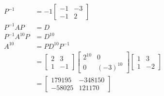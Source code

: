 \documentclass{math}
\begin{document}
\begin{align*}
  P^{-1} &= -1\begin{bmatrix}-1 & -3 \\ -1 & 2\end{bmatrix} \\
  P^{-1}AP &= D \\
  P^{-1}A^{10}P &= D^{10} \\
  A^{10} &= PD^{10}P^{-1} \\
  &= \begin{bmatrix}2 & 3 \\ 1 & -1\end{bmatrix}
    \begin{bmatrix}2^{10} & 0 \\ 0 & (-3)^{10}\end{bmatrix}
    \begin{bmatrix}1 & 3 \\ 1 & -2\end{bmatrix} \\
  &= \begin{bmatrix}
    179195 & -348150 \\
    -58025 & 121170
  \end{bmatrix}
\end{align*}
\end{document}
